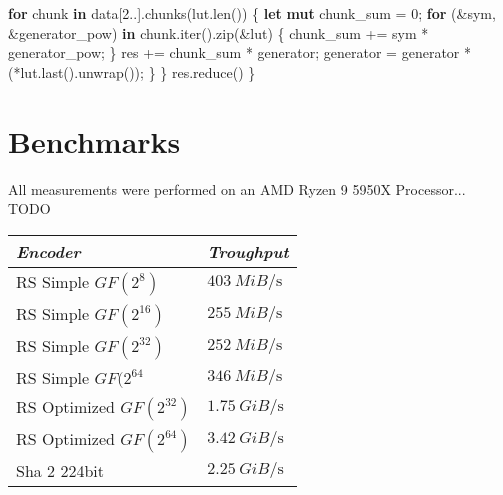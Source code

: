 \documentclass[
]{article}
\newenvironment{Shaded}{}{}
\newcommand{\DecValTok}[1]{\textcolor[rgb]{0.25,0.63,0.44}{#1}}
\newcommand{\KeywordTok}[1]{\textcolor[rgb]{0.00,0.44,0.13}{\textbf{#1}}}
\newcommand{\NormalTok}[1]{#1}
\newcommand{\OperatorTok}[1]{\textcolor[rgb]{0.40,0.40,0.40}{#1}}
\begin{document}
\begin{Shaded}
\begin{Highlighting}[]
        \KeywordTok{for}\NormalTok{ chunk }\KeywordTok{in}\NormalTok{ data[}\DecValTok{2}\OperatorTok{..}\NormalTok{]}\OperatorTok{.}\NormalTok{chunks(lut}\OperatorTok{.}\NormalTok{len()) }\OperatorTok{\{}
            \KeywordTok{let} \KeywordTok{mut}\NormalTok{ chunk\_sum }\OperatorTok{=} \DecValTok{0}\OperatorTok{;}
            \KeywordTok{for}\NormalTok{ (}\OperatorTok{\&}\NormalTok{sym}\OperatorTok{,} \OperatorTok{\&}\NormalTok{generator\_pow) }\KeywordTok{in}\NormalTok{ chunk}\OperatorTok{.}\NormalTok{iter()}\OperatorTok{.}\NormalTok{zip(}\OperatorTok{\&}\NormalTok{lut) }\OperatorTok{\{}
\NormalTok{                chunk\_sum }\OperatorTok{+=}\NormalTok{ sym }\OperatorTok{*}\NormalTok{ generator\_pow}\OperatorTok{;}
            \OperatorTok{\}}
\NormalTok{            res }\OperatorTok{+=}\NormalTok{ chunk\_sum }\OperatorTok{*}\NormalTok{ generator}\OperatorTok{;}
\NormalTok{            generator }\OperatorTok{=}\NormalTok{ generator }\OperatorTok{*}\NormalTok{ (}\OperatorTok{*}\NormalTok{lut}\OperatorTok{.}\NormalTok{last()}\OperatorTok{.}\NormalTok{unwrap())}\OperatorTok{;}
        \OperatorTok{\}}
    \OperatorTok{\}}
\NormalTok{    res}\OperatorTok{.}\NormalTok{reduce()}
\OperatorTok{\}}
\end{Highlighting}
\end{Shaded}

\newpage
\section{Benchmarks}

All measurements were performed on an AMD Ryzen 9 5950X Processor... TODO

\begin{tabular}{*2l}    \toprule
\emph{Encoder} & \emph{Troughput}  \\\midrule
RS Simple $GF(2^{8})$ & $\SI{403}{MiB\per\second}$ \\ 
RS Simple $GF(2^{16})$ & $\SI{255}{MiB\per\second}$ \\ 
RS Simple $GF(2^{32})$ & $\SI{252}{MiB\per\second}$ \\ 
RS Simple $GF(2^{64}$ & $\SI{346}{MiB\per\second}$ \\ 
RS Optimized $GF(2^{32})$ & $\SI{1.75}{GiB\per\second}$ \\ 
RS Optimized $GF(2^{64})$ & $\SI{3.42}{GiB\per\second}$ \\ 
Sha 2 224bit & $\SI{2.25}{GiB\per\second}$ 
\end{tabular}
\end{document}
